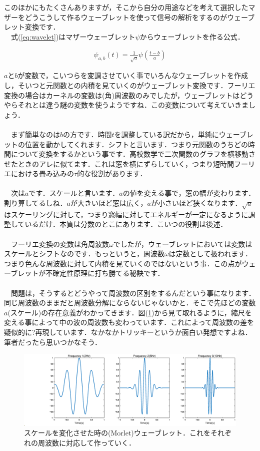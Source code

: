 \documentclass[11pt,a4paper]{ujreport} 	%
\begin{document}
このほかにもたくさんありますが，そこから自分の用途などを考えて選択したマザーをどうこうして作るウェーブレットを使って信号の解析をするのがウェーブレット変換です．\\
　式(\ref{eq:wavelet})はマザーウェーブレット$\psi$からウェーブレットを作る公式．

\begin{eqnarray}
\psi_{a,b}(t)  = \frac{1}{\sqrt{a}}\psi(\frac{t-b}{a})
\label{eq:wavelet}
\end{eqnarray}

$a$と$b$が変数で，こいつらを変調させていく事でいろんなウェーブレットを作成し，そいつと元関数との内積を見ていくのがウェーブレット変換です．フーリエ変換の場合はカーネルの変数は(角)周波数のみでしたが，ウェーブレットはどうやらそれとは違う謎の変数を使うようですね．この変数について考えていきましょう．\\
\\
　まず簡単なのは$b$の方です．時間$t$を調整している訳だから，単純にウェーブレットの位置を動かしてくれます．シフトと言います．つまり元関数のうちどの時間について変換をするかという事です．高校数学で二次関数のグラフを横移動させたときのアレに似てます．これは窓を横にずらしていく，つまり短時間フーリエにおける畳み込みの$\tau$的な役割があります．\\
\\
　次は$a$です．スケールと言います．$a$の値を変える事で，窓の幅が変わります．割り算してるしね．$a$が大きいほど窓は広く，$a$が小さいほど狭くなります．$\sqrt{a}$はスケーリングに対して，つまり窓幅に対してエネルギーが一定になるように調整しているだけ．本質は分数のとこにあります．こいつの役割は後述．\\
\\
　フーリエ変換の変数は角周波数$\omega$でしたが，ウェーブレットにおいては変数はスケールとシフトなのです．もっというと，周波数$\omega$は定数として扱われます．つまり色んな周波数に対して内積を見ていくのではないという事．この点がウェーブレットが不確定性原理に打ち勝てる秘訣です．\\
\\
　問題は，そうするとどうやって周波数の区別をするんだという事になります．同じ周波数のままだと周波数分解にならないじゃないかと．そこで先ほどの変数$a$(スケール)の存在意義がわかってきます．図(\ref{im:scale})から見て取れるように，縮尺を変える事によって中の波の周波数も変わっています．これによって周波数の差を疑似的に?再現しています．なかなかトリッキーというか面白い発想ですよね．筆者だったら思いつかなそう．

\begin{figure}[H]
  \label{im:scale}
  \centering
  \includegraphics[width=12cm]{../figures/wavelet-scale.eps}
  \caption{スケールを変化させた時の(Morlet)ウェーブレット．これをそれぞれの周波数に対応して作っていく．}
\end{figure}
\end{document}
